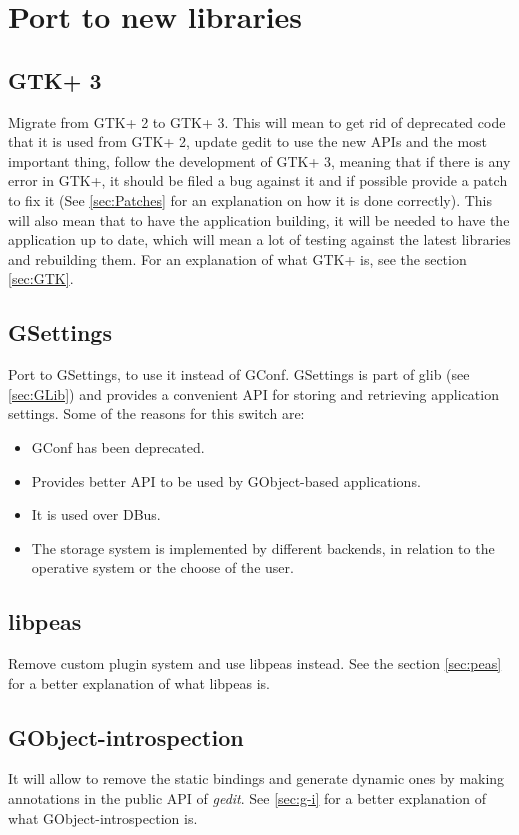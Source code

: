 
\section{Port to new libraries}\label{sec:NewLibraries}

\subsection{GTK+ 3}\label{sec:GTK3}

Migrate from GTK+ 2 to GTK+ 3. This will mean to get rid of deprecated code that it is used from GTK+ 2, update gedit to use the new APIs and the most important thing, follow the development of GTK+ 3, meaning that if there is any error in GTK+, it should be filed a bug against it and if possible provide a patch to fix it (See \ref{sec:Patches} for an explanation on how it is done correctly). This will also mean that to have the application building, it will be needed to have the application up to date, which will mean a lot of testing against the latest libraries and rebuilding them. For an explanation of what GTK+ is, see the section \ref{sec:GTK}.

\subsection[GSettings]{GSettings\cite{website:gio}}\label{sec:GSettings}

Port to GSettings, to use it instead of GConf. GSettings is part of glib (see \ref{sec:GLib}) and provides a convenient API for storing and retrieving application settings. Some of the reasons for this switch are:
\begin{itemize}
  \item GConf has been deprecated.
  \item Provides better API to be used by GObject-based applications.
  \item It is used over DBus.
  \item The storage system is implemented by different backends, in relation to the operative system or the choose of the user.
\end{itemize}

\subsection{libpeas}\label{sec:libpeas}

Remove custom plugin system and use libpeas instead. See the section \ref{sec:peas} for a better explanation of what libpeas is.

\subsection{GObject-introspection}\label{sec:GObjectIntrospection}

It will allow to remove the static bindings and generate dynamic ones by making annotations in the public API of \emph{gedit}. See \ref{sec:g-i} for a better explanation of what GObject-introspection is.
